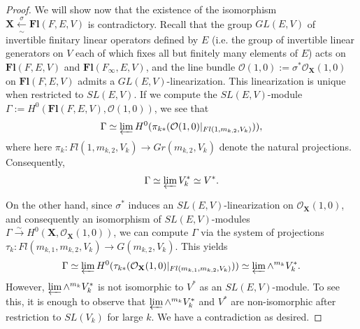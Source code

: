 \documentclass[12pt]{amsart}
\theoremstyle{definition}
\begin{document}
\begin{proof}
We will show now that the existence of the isomorphism 
$\mathbf{X}\xleftarrow[\sim]{\sigma}\mathbf{Fl}(F,E,V)$ is 
contradictory. Recall that the group $GL(E,V)$ of invertible finitary linear operators defined by $E$ (i.e. the group of 
invertible linear generators on $V$ each of which fixes all but finitely many elements of $E$) acts on $\mathbf{Fl}(F,E,V)
$ and $\mathbf{Fl}({F_{\infty}},E,V)$, and the line bundle 
$\mathcal{O}(1,0):=\sigma^*\mathcal{O}_{\mathbf{X}}(1,0)$ on 
$\mathbf{Fl}(F,E,V)$ admits a $GL(E,V)$-linearization. This 
linearization is unique when restricted to $SL(E,V)$. If we 
compute the $SL(E,V)$-module $\Gamma:=H^0(\mathbf{Fl}(F,E,V),
\mathcal{O}(1,0))$, we see that $$\Gamma\simeq\varprojlim 
H^0(\pi_{k*}(\mathcal{O}(1,0)|_{Fl(1,m_{k,2},V_k)})),$$ 
where here $\pi_k: Fl(1,m_{k,2},V_k)\to Gr(m_{k,2},V_k)$ 
denote the natural projections. Consequently,
$$
\Gamma\simeq\varprojlim V_k^*\simeq V^*.
$$

On the other hand, since $\sigma^*$ induces an 
$SL(E,V)$-linearization on $\mathcal{O}_{\mathbf{X}}(1,0)$, and
consequently an isomorphism of $SL(E,V)$-modules
$\Gamma\xrightarrow{\sim}H^0(\mathbf{X},
\mathcal{O}_{\mathbf{X}}(1,0))$, we can compute $\Gamma$ via 
the system of projections $\tau_k: Fl(m_{k,1},m_{k,2},V_k)\to 
G(m_{k,2},V_k)$. This yields
$$
\Gamma\simeq\varprojlim 
H^0(\tau_{k*}(\mathcal{O}_{\mathbf{X}}(1,0)|_{Fl(m_{k,1},
m_{k,2},V_k)}))\simeq\varprojlim\wedge^{m_k}V_k^*.
$$
However, $\varprojlim\wedge^{m_k} V_k^*$ is not isomorphic to
$V^*$ as an $SL(E,V)$-module. To see this, it is enough to 
observe that $\varprojlim\wedge^{m_k} V_k^*$ and $V^*$ are
non-isomorphic after restriction to $SL(V_k)$ for large $k$.
We have a contradiction as desired.
\end{proof}


\vspace{5mm}
\end{document}
